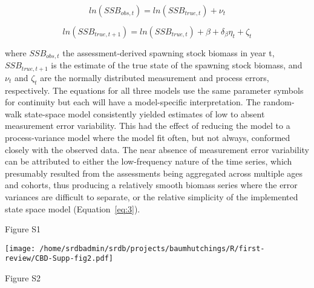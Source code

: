 \documentclass[letterpaper,12pt]{article}
\begin{document}
\begin{equation}
ln\left(SSB_{obs,t}\right) = ln\left(SSB_{true,t}\right) + \nu_{t}
\end{equation}

\begin{equation}
ln\left(SSB_{true,t+1}\right) = ln\left(SSB_{true,t}\right) + \beta + \delta_{\beta}\eta_{t} + \zeta_{t}
\label{eq:3}
\end{equation}

where $SSB_{obs,t}$ the assessment-derived spawning stock biomass in year t, $SSB_{true,t+1}$ is
the estimate of the true state of the spawning stock biomass, and $\nu_{t}$
and $\zeta_{t}$ are the normally distributed measurement and process errors,
respectively. The equations for all three models use the same
parameter symbols for continuity but each will have a model-specific
interpretation. The random-walk state-space model consistently yielded
estimates of low to absent measurement error variability. This had the
effect of reducing the model to a process-variance model where the
model fit often, but not always, conformed closely with the observed
data. The near absence of measurement error variability can be
attributed to either the low-frequency nature of the time series,
which presumably resulted from the assessments being aggregated across
multiple ages and cohorts, thus producing a relatively smooth biomass
series where the error variances are difficult to separate, or the
relative simplicity of the implemented state space model (Equation~\ref{eq:3}).


\clearpage

\begin{tiny}
\begin{landscape}

\end{landscape}
\end{tiny}

\clearpage


\noindent 
Figure S1

\clearpage

\begin{center}
\texttt{[image: /home/srdbadmin/srdb/projects/baumhutchings/R/first-review/CBD-Supp-fig2.pdf]}
\end{center}
\noindent 
Figure S2
\end{document}
